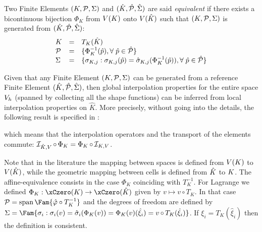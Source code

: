 \begin{dfntn}
Two Finite Elements ${({K},{\mathcal P}, {\Sigma})}$ and ${({\hat {{K}}},{\hat {{\mathcal P}}}, {\hat{{\Sigma}}})}$ are said \textit{equivalent} if there exists a bicontinuous bijection $\Phi_K$ from ${V}({K})$ onto ${V}({\hat {{K}}})$ such that ${({K},{\mathcal P}, {\Sigma})}$ is generated from ${({\hat {{K}}},{\hat {{\mathcal P}}}, {\hat{{\Sigma}}})}$:
\begin{equation*}
\begin{array}{lcl}
K       &=& T_K(\hat K)\\
{\mathcal P} &=& \lbrace \Phi_K^{-1}(\hat p), {\forall\;} \hat p \in {\hat {{\mathcal P}}} \rbrace\\
\Sigma  &=& \lbrace \sigma_{K,j} : \sigma_{K,j}(\hat p) = \hat\sigma_{K,j}(\Phi_K^{-1}(\hat p)), {\forall\;} \hat p \in {\hat {{\mathcal P}}} \rbrace
\end{array}
\end{equation*}
\end{dfntn}

Given that any Finite Element ${({K},{\mathcal P}, {\Sigma})}$ can be generated from a reference Finite Element ${({\hat {{K}}},{\hat {{\mathcal P}}}, {\hat{{\Sigma}}})}$, then global interpolation properties for the entire space ${{V}}_h$ (spanned by collecting all the shape functions) can be inferred from local interpolation properties on $\hat K$. More precisely, without going into the details, the following result is specified in \cite{EG}:
\begin{center}
\end{center}
which means that the interpolation operators and the transport of the elements commute: $\mathop{\mathcal{I}_{{\hat {{K}}},{V}}}\mathop{\circ}\Phi_K = \Phi_K\mathop{\circ} \mathop{\mathcal{I}_{K,{V}}}$.

\begin{rmrk}
Note that in the literature the mapping between spaces is defined from ${V}({K})$ to ${V}({\hat {{K}}})$, while the geometric mapping between cells is defined from ${\hat {{K}}}$ to ${K}$. The affine-equivalence consists in the case $\Phi_K$ coinciding with $T_K^{-1}$. For Lagrange we defined $\Phi_K: \xCzero(K) \rightarrow \xCzero(\hat K)$ given by $v \mapsto v\mathop{\circ}T_K$.
In that case $\SpaceP = \Span\Fam{ \hat\varphi\circ T_K^{-1} }$ and the degrees of freedom are defined by $\Sigma = \Fam{\sigma_i : \sigma_i(v) = \hat\sigma_i(\Phi_K(v)) = \Phi_K(v)(\hat\xi_i) = v\mathop{\circ} T_K(\hat\xi_i)}$.
If $\xi_i = T_K(\hat\xi_i)$ then the definition is consistent.
\end{rmrk}



